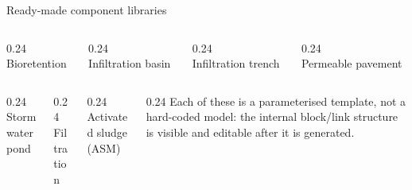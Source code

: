 \documentclass[aspectratio=169, 10pt]{beamer}
\begin{document}
\begin{frame}{Ready-made component libraries}
  \begin{columns}[c,onlytextwidth]
    \begin{column}{0.24\textwidth}\centering
      \\{\tiny Bioretention}
    \end{column}
    \begin{column}{0.24\textwidth}\centering
      \\{\tiny Infiltration basin}
    \end{column}
    \begin{column}{0.24\textwidth}\centering
      \\{\tiny Infiltration trench}
    \end{column}
    \begin{column}{0.24\textwidth}\centering
      \\{\tiny Permeable pavement}
    \end{column}
  \end{columns}
  \vspace{0.8em}
  \begin{columns}[c,onlytextwidth]
    \begin{column}{0.24\textwidth}\centering
      \\{\tiny Stormwater pond}
    \end{column}
    \begin{column}{0.24\textwidth}\centering
      \\{\tiny Filtration}
    \end{column}
    \begin{column}{0.24\textwidth}\centering
      \\{\tiny Activated sludge (ASM)}
    \end{column}
    \begin{column}{0.24\textwidth}
      {\footnotesize Each of these is a \alert{parameterised template}, not a
      hard-coded model: the internal block/link structure is visible and
      editable after it is generated.}
    \end{column}
  \end{columns}
\end{frame}

\end{document}
